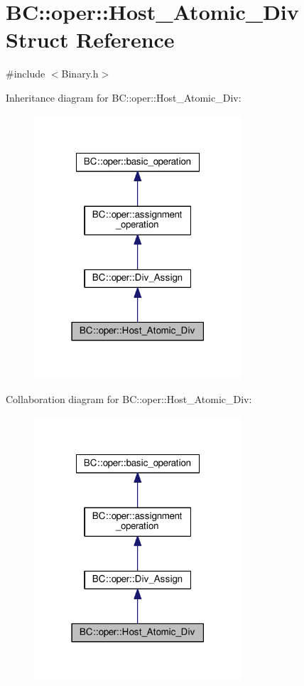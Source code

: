 \hypertarget{structBC_1_1oper_1_1Host__Atomic__Div}{}\section{BC\+:\+:oper\+:\+:Host\+\_\+\+Atomic\+\_\+\+Div Struct Reference}
\label{structBC_1_1oper_1_1Host__Atomic__Div}


{\ttfamily \#include $<$Binary.\+h$>$}



Inheritance diagram for BC\+:\+:oper\+:\+:Host\+\_\+\+Atomic\+\_\+\+Div\+:
\nopagebreak
\begin{figure}[H]
\begin{center}
\leavevmode
\includegraphics[width=219pt]{structBC_1_1oper_1_1Host__Atomic__Div__inherit__graph}
\end{center}
\end{figure}


Collaboration diagram for BC\+:\+:oper\+:\+:Host\+\_\+\+Atomic\+\_\+\+Div\+:
\nopagebreak
\begin{figure}[H]
\begin{center}
\leavevmode
\includegraphics[width=219pt]{structBC_1_1oper_1_1Host__Atomic__Div__coll__graph}
\end{center}
\end{figure}
